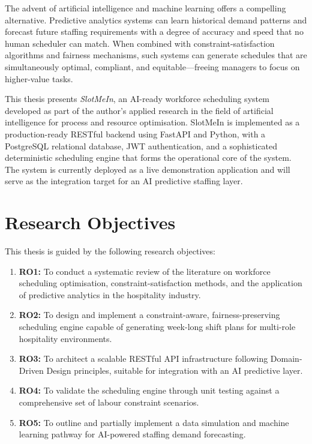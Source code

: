 \documentclass[12pt,a4paper]{report}
\begin{document}
The advent of artificial intelligence and machine learning offers a compelling alternative. Predictive analytics systems can learn historical demand patterns and forecast future staffing requirements with a degree of accuracy and speed that no human scheduler can match. When combined with constraint-satisfaction algorithms and fairness mechanisms, such systems can generate schedules that are simultaneously optimal, compliant, and equitable—freeing managers to focus on higher-value tasks.

This thesis presents \textit{SlotMeIn}, an AI-ready workforce scheduling system developed as part of the author's applied research in the field of artificial intelligence for process and resource optimisation. SlotMeIn is implemented as a production-ready RESTful backend using FastAPI and Python, with a PostgreSQL relational database, JWT authentication, and a sophisticated deterministic scheduling engine that forms the operational core of the system. The system is currently deployed as a live demonstration application and will serve as the integration target for an AI predictive staffing layer.

\section{Research Objectives}

This thesis is guided by the following research objectives:

\begin{enumerate}[leftmargin=1.5cm]
    \item \textbf{RO1:} To conduct a systematic review of the literature on workforce scheduling optimisation, constraint-satisfaction methods, and the application of predictive analytics in the hospitality industry.
    \item \textbf{RO2:} To design and implement a constraint-aware, fairness-preserving scheduling engine capable of generating week-long shift plans for multi-role hospitality environments.
    \item \textbf{RO3:} To architect a scalable RESTful API infrastructure following Domain-Driven Design principles, suitable for integration with an AI predictive layer.
    \item \textbf{RO4:} To validate the scheduling engine through unit testing against a comprehensive set of labour constraint scenarios.
    \item \textbf{RO5:} To outline and partially implement a data simulation and machine learning pathway for AI-powered staffing demand forecasting.
\end{enumerate}
\end{document}
